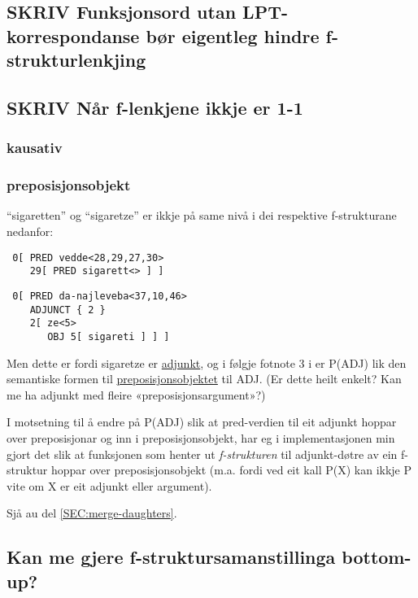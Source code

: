 \documentclass[11pt,a4paper,oneside,draft]{book}
\begin{document}
\subsection{\textbf{SKRIV} Funksjonsord utan LPT-korrespondanse bør eigentleg hindre f-strukturlenkjing}
\label{sec-4.1.2}

\subsection{\textbf{SKRIV} Når f-lenkjene ikkje er 1-1}
\label{sec-4.1.3}

\subsubsection{kausativ}
\label{sec-4.1.3.1}

\subsubsection{preposisjonsobjekt}
\label{sec-4.1.3.2}

``sigaretten'' og ``sigaretze'' er ikkje på same nivå i dei respektive
f-strukturane nedanfor:
\begin{verbatim}
 0[ PRED vedde<28,29,27,30>
    29[ PRED sigarett<> ] ]
\end{verbatim}


\begin{verbatim}
 0[ PRED da-najleveba<37,10,46>
    ADJUNCT { 2 }
    2[ ze<5>
       OBJ 5[ sigareti ] ] ]
\end{verbatim}


Men dette er fordi sigaretze er \underline{adjunkt}, og i følgje fotnote 3 i
\citet{dyvik2009lmp} er P(ADJ) lik den semantiske formen til
\underline{preposisjonsobjektet} til ADJ. (Er dette heilt enkelt? Kan me ha
adjunkt med fleire «preposisjonsargument»?)

I motsetning til å endre på P(ADJ) slik at pred-verdien til eit
adjunkt hoppar over preposisjonar og inn i preposisjonsobjekt, har eg
i implementasjonen min gjort det slik at funksjonen som henter ut \emph{f-strukturen} til adjunkt-døtre av ein f-struktur hoppar over
preposisjonsobjekt (m.a. fordi ved eit kall P(X) kan ikkje P vite om X
er eit adjunkt eller argument).

Sjå au del \ref{SEC:merge-daughters}.

\subsection{Kan me gjere f-struktursamanstillinga bottom-up?}
\label{sec-4.1.4}
\end{document}
